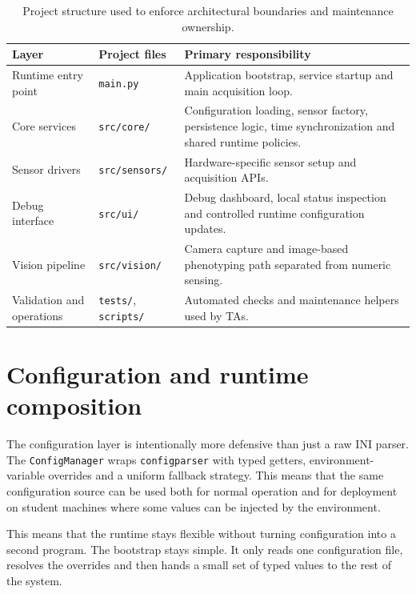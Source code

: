 \begin{table}[H]
\centering
\caption[PhenoHive Project Structure]{Project structure used to enforce architectural boundaries and maintenance ownership.}
\label{tab:system-architecture-project-structure}
\small
\setlength{\tabcolsep}{5pt}
\renewcommand{\arraystretch}{1.2}
\begin{tabularx}{\textwidth}{|P{2.9cm}|P{3.8cm}|X|}
\hline
\textbf{Layer} & \textbf{Project files} & \textbf{Primary responsibility} \\
\hline
Runtime entry point & \texttt{main.py} & Application bootstrap, service startup and main acquisition loop. \\
\hline
Core services & \texttt{src/core/} & Configuration loading, sensor factory, persistence logic, time synchronization and shared runtime policies. \\
\hline
Sensor drivers & \texttt{src/sensors/} & Hardware-specific sensor setup and acquisition APIs. \\
\hline
Debug interface & \texttt{src/ui/} & Debug dashboard, local status inspection and controlled runtime configuration updates. \\
\hline
Vision pipeline & \texttt{src/vision/} & Camera capture and image-based phenotyping path separated from numeric sensing. \\
\hline
Validation and operations & \texttt{tests/}, \texttt{scripts/} & Automated checks and maintenance helpers used by TAs. \\
\hline
\end{tabularx}
\end{table}

\section{Configuration and runtime composition}

The configuration layer is intentionally more defensive than just a raw INI parser. The \texttt{ConfigManager} wraps \texttt{configparser} with typed getters, environment-variable overrides and a uniform fallback strategy. This means that the same configuration source can be used both for normal operation and for deployment on student machines where some values can be injected by the environment.

This means that the runtime stays flexible without turning configuration into a second program. The bootstrap stays simple. It only reads one configuration file, resolves the overrides and then hands a small set of typed values to the rest of the system.

